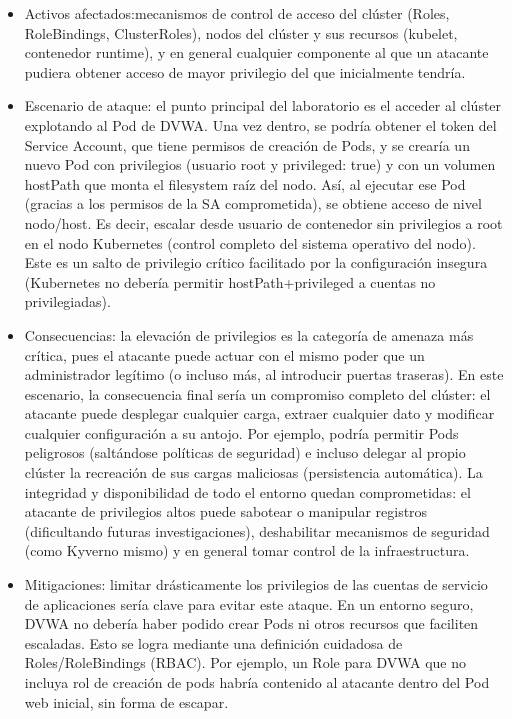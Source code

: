 \documentclass[12pt,twoside,titlepage]{report}
\begin{document}
\begin{itemize}
    \item Activos afectados:mecanismos de control de acceso del clúster (Roles, RoleBindings, ClusterRoles), nodos del clúster y sus recursos (kubelet, contenedor runtime), y en general cualquier componente al que un atacante pudiera obtener acceso de mayor privilegio del que inicialmente tendría.
    \item Escenario de ataque: el punto principal del laboratorio es el acceder al clúster explotando al Pod de DVWA. Una vez dentro, se podría obtener el token del Service Account, que tiene permisos de creación de Pods, y se crearía un nuevo Pod con privilegios (usuario root y privileged: true) y con un volumen hostPath que monta el filesystem raíz del nodo. Así, al ejecutar ese Pod (gracias a los permisos de la SA comprometida), se obtiene acceso de nivel nodo/host. Es decir, escalar desde usuario de contenedor sin privilegios a root en el nodo Kubernetes (control completo del sistema operativo del nodo). Este es un salto de privilegio crítico facilitado por la configuración insegura (Kubernetes no debería permitir hostPath+privileged a cuentas no privilegiadas).
    \item Consecuencias: la elevación de privilegios es la categoría de amenaza más crítica, pues el atacante puede actuar con el mismo poder que un administrador legítimo (o incluso más, al introducir puertas traseras). En este escenario, la consecuencia final sería un compromiso completo del clúster: el atacante puede desplegar cualquier carga, extraer cualquier dato y modificar cualquier configuración a su antojo. Por ejemplo, podría permitir Pods peligrosos (saltándose políticas de seguridad) e incluso delegar al propio clúster la recreación de sus cargas maliciosas (persistencia automática). La integridad y disponibilidad de todo el entorno quedan comprometidas: el atacante de privilegios altos puede sabotear o manipular registros (dificultando futuras investigaciones), deshabilitar mecanismos de seguridad (como Kyverno mismo) y en general tomar control de la infraestructura.
    \item Mitigaciones: limitar drásticamente los privilegios de las cuentas de servicio de aplicaciones sería clave para evitar este ataque. En un entorno seguro, DVWA no debería haber podido crear Pods ni otros recursos que faciliten escaladas. Esto se logra mediante una definición cuidadosa de Roles/RoleBindings (RBAC). Por ejemplo, un Role para DVWA que no incluya rol de creación de pods habría contenido al atacante dentro del Pod web inicial, sin forma de escapar.
\end{itemize}
\end{document}
